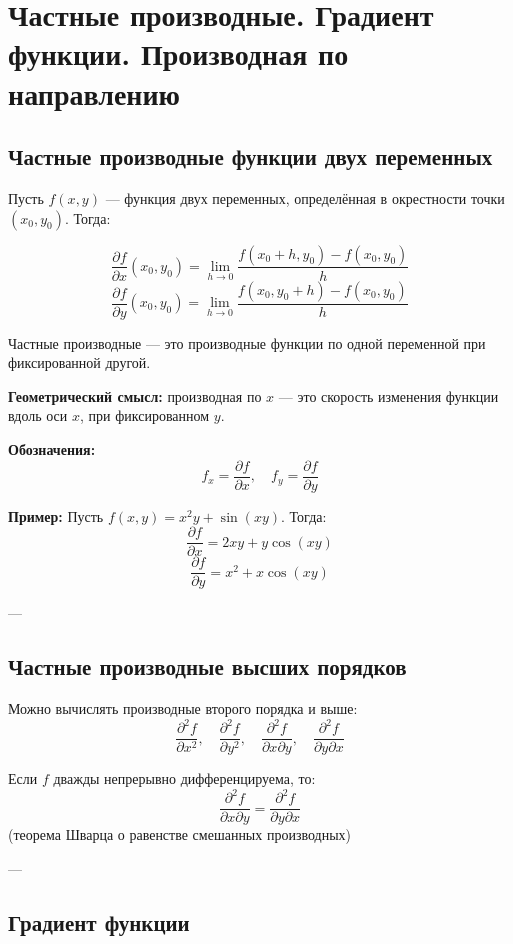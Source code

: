 \section{Частные производные. Градиент функции. Производная по направлению}

\subsection*{Частные производные функции двух переменных}

Пусть $f(x, y)$ — функция двух переменных, определённая в окрестности точки $(x_0, y_0)$. Тогда:

\[
\frac{\partial f}{\partial x}(x_0, y_0) = \lim_{h \to 0} \frac{f(x_0 + h, y_0) - f(x_0, y_0)}{h}
\]
\[
\frac{\partial f}{\partial y}(x_0, y_0) = \lim_{h \to 0} \frac{f(x_0, y_0 + h) - f(x_0, y_0)}{h}
\]

Частные производные — это производные функции по одной переменной при фиксированной другой.

\textbf{Геометрический смысл:} производная по $x$ — это скорость изменения функции вдоль оси $x$, при фиксированном $y$.

\textbf{Обозначения:}
\[
f_x = \frac{\partial f}{\partial x}, \quad f_y = \frac{\partial f}{\partial y}
\]

\textbf{Пример:}
Пусть $f(x, y) = x^2 y + \sin(xy)$. Тогда:
\[
\frac{\partial f}{\partial x} = 2xy + y \cos(xy)
\]
\[
\frac{\partial f}{\partial y} = x^2 + x \cos(xy)
\]

---

\subsection*{Частные производные высших порядков}

Можно вычислять производные второго порядка и выше:
\[
\frac{\partial^2 f}{\partial x^2}, \quad
\frac{\partial^2 f}{\partial y^2}, \quad
\frac{\partial^2 f}{\partial x \partial y}, \quad
\frac{\partial^2 f}{\partial y \partial x}
\]

Если $f$ дважды непрерывно дифференцируема, то:
\[
\frac{\partial^2 f}{\partial x \partial y} = \frac{\partial^2 f}{\partial y \partial x}
\]
(теорема Шварца о равенстве смешанных производных)

---

\subsection*{Градиент функции}

